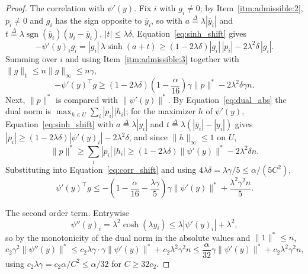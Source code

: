 \documentclass[11pt]{article}
\newcommand{\sgn}{\operatorname{sgn}}
\newcommand{\defeq}{\stackrel{\Delta}{=}}
\begin{document}
\begin{proof}
The correlation with $\psi'(y)$.
Fix $i$ with
$g_i \ne 0$; by Item~\ref{itm:admissible:2},
$p_i \ne 0$ and
$g_i$ has the sign opposite to
$\overline{y}_i$, so with
$a \defeq \lambda |\overline{y}_i|$ and
$t \defeq \lambda \sgn(\overline{y}_i) (y_i - \overline{y}_i)$,
$|t| \le \lambda \delta$, Equation~\eqref{eq:sinh_shift} gives
\[
- \psi'(y)_i g_i
=
|g_i| \, \lambda \sinh(a + t)
\ge
\left( 1 - 2 \lambda \delta \right) |g_i| \, |p_i| - 2 \lambda^{2} \delta \, |g_i| .
\]
Summing over $i$ and using Item~\ref{itm:admissible:3} together with
$\|g\|_1 \le n \|g\|_{\infty} \le n \gamma$,
\begin{equation}
\label{eq:corr_shift}
- \psi'(y)^\top g
\ge
\left( 1 - 2 \lambda \delta \right)
\left( 1 - \frac{\alpha}{16} \right) \gamma \|p\|^{*}
- 2 \lambda^{2} \delta \gamma n .
\end{equation}
Next, $\|p\|^{*}$ is compared with
$\|\psi'(y)\|^{*}$.
By Equation~\eqref{eq:dual_abs} the dual norm is
$\max_{h \in U} \sum_i |p_i| |h_i|$; for the maximizer
$h$ of
$\psi'(y)$, Equation~\eqref{eq:sinh_shift} with
$a \defeq \lambda |y_i|$ and
$t \defeq \lambda (|\overline{y}_i| - |y_i|)$ gives
$|p_i| \ge (1 - 2 \lambda \delta) |\psi'(y)_i| - 2 \lambda^{2} \delta$, and
since $\|h\|_{\infty} \le 1$ on
$U$,
\[
\|p\|^{*}
\ge
\sum_i |p_i| \, |h_i|
\ge
\left( 1 - 2 \lambda \delta \right) \|\psi'(y)\|^{*} - 2 \lambda^{2} \delta n .
\]
Substituting into Equation~\eqref{eq:corr_shift} and using
$4 \lambda \delta = \lambda \gamma / 5 \le \alpha / (5 C^{2})$,
\begin{equation}
\label{eq:corr_final}
\psi'(y)^\top g
\le
- \left( 1 - \frac{\alpha}{16} - \frac{\lambda \gamma}{5} \right)
\gamma \|\psi'(y)\|^{*}
+ \frac{\lambda^{2} \gamma^{2} n}{5} .
\end{equation}

The second order term.
Entrywise
\[
\psi''(y)_i
=
\lambda^{2} \cosh(\lambda y_i)
\le
\lambda \left| \psi'(y)_i \right| + \lambda^{2},
\]
so by the monotonicity of the dual norm in the absolute values and
$\|1\|^{*} \le n$,
\[
c_{2} \gamma^{2} \|\psi''(y)\|^{*}
\le
c_{2} \lambda \gamma \cdot \gamma \|\psi'(y)\|^{*} + c_{2} \lambda^{2} \gamma^{2} n
\le
\frac{\alpha}{32} \gamma \|\psi'(y)\|^{*} + c_{2} \lambda^{2} \gamma^{2} n,
\]
using $c_{2} \lambda \gamma = c_{2} \alpha / C^{2} \le \alpha / 32$ for
$C \ge 32 c_{2}$.


\end{proof}
\end{document}
